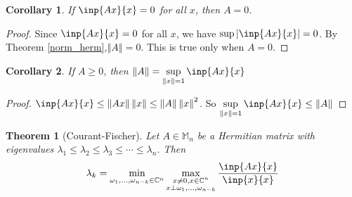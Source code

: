 \documentclass[twofold]{article}
\newcommand*\norm[1]{\left \Vert #1 \right\Vert}
\newcommand*\abs[1]{\left \vert #1 \right\vert}
\theoremstyle{plain}
\newtheorem{theorem}{Theorem}
\newtheorem*{corollary}{Corollary}
\theoremstyle{definition}
\theoremstyle{remark}
\begin{document}
\begin{corollary} If \(\inp{Ax}{x} = 0\) for all \(x\), then \(A = 0\).\end{corollary}
\begin{proof} Since \(\inp{Ax}{x} = 0\) for all \(x\), we have \(\sup \abs{\inp{Ax}{x}} = 0\). By Theorem \ref{norm_herm},\( \norm{A} = 0 \). This is true only when \(A = 0\).\end{proof}


\begin{corollary} If \(A \ge 0\), then \(\displaystyle \norm{A} = \sup _{\norm{x} = 1} \inp{Ax}{x}\) \end{corollary}
\begin{proof} \(\inp{Ax}{x} \le \norm{Ax} \norm{x} \le \norm{A} \norm{x}^2\). So \(\displaystyle \sup_{\norm{x} = 1} \inp{Ax}{x} \leq \norm{A} \) \end{proof}



\begin{theorem}[Courant-Fischer] Let \(A \in \mathbb{M}_n\) be a Hermitian matrix with eigenvalues \(\lambda_1 \le \lambda_2 \le \lambda_3 \le \cdots \le \lambda_n\). Then 
  \[ \lambda_k = \min_{\omega_1, \ldots , \omega_{n-k} \in \mathbb{C}^n} \max_{\substack{x \neq 0, x\in \mathbb{C}^n \\ x \perp \omega_1, \ldots , \omega_{n-k}}} \frac{\inp{Ax}{x}}{\inp{x}{x}}\]
 \end{theorem}
\end{document}
